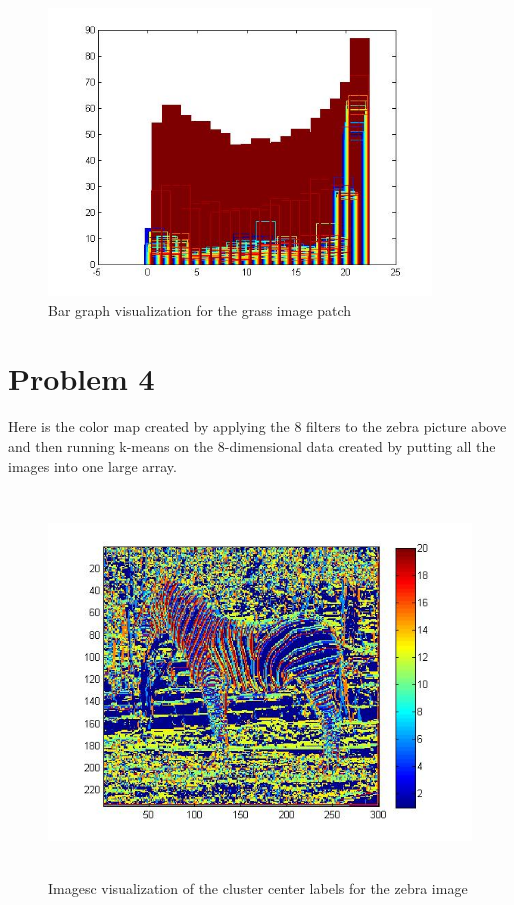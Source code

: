 \documentclass[11pt,psfig]{article}
\begin{document}
\begin{figure}[H]
\centering
\includegraphics[height=3in]{prob3patch3bar.jpg}
\caption{Bar graph visualization for the grass image patch}
\end{figure}

\newpage

\section*{Problem 4}

Here is the color map created by applying the 8 filters to the zebra picture above and then running k-means on the 8-dimensional data created by putting all the images into one large array. 

\begin{figure}[H]
\centering
\includegraphics[height=4in]{prob4plot.jpg}
\caption{Imagesc visualization of the cluster center labels for the zebra image}
\end{figure}
\end{document}

